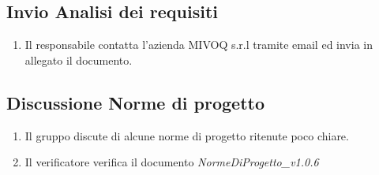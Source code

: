 \documentclass[11pt,a4paper]{article}
\begin{document}
		\subsection{Invio Analisi dei requisiti}
	\begin{enumerate}
		\item Il responsabile contatta l'azienda MIVOQ s.r.l tramite email ed invia in allegato il documento.
	\end{enumerate}
	\subsection{Discussione Norme di progetto}
	\begin{enumerate}
		\item Il gruppo discute di alcune norme di progetto ritenute poco chiare.
		\item Il verificatore  verifica il documento \textit{NormeDiProgetto\_v1.0.6}
	\end{enumerate}
	
\end{document}
